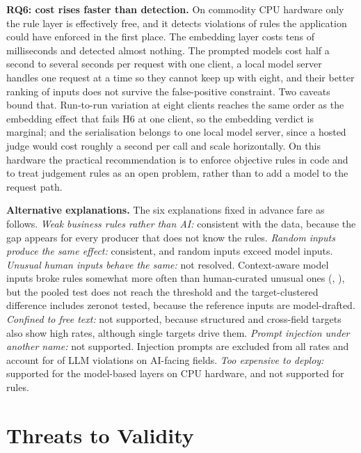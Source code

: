 \documentclass[journal]{IEEEtran}
\begin{document}
\textbf{RQ6: cost rises faster than detection.} On commodity CPU hardware only the rule layer is
effectively free, and it detects violations of rules the application could have enforced in the first
place. The embedding layer costs tens of milliseconds and detected almost nothing. The prompted models
cost half a second to several seconds per request with one client, a local model server handles one
request at a time so they cannot keep up with eight, and their better ranking of inputs does not
survive the false-positive constraint. Two caveats bound that. Run-to-run variation at eight clients
reaches the same order as the embedding effect that fails H6 at one client, so the embedding verdict is
marginal; and the serialisation belongs to one local model server, since a hosted judge would cost
roughly a second per call and scale horizontally. On this hardware the practical recommendation is to
enforce objective rules in code and to treat judgement rules as an open problem, rather than to add a
model to the request path.

\textbf{Alternative explanations.} The six explanations fixed in advance fare as follows. \emph{Weak
business rules rather than AI:} consistent with the data, because the gap appears for every producer
that does not know the rules. \emph{Random inputs produce the same effect:} consistent, and random
inputs exceed model inputs. \emph{Unusual human inputs behave the same:} \ifreviewed not resolved. Context-aware model inputs
broke rules somewhat more often than human-curated unusual ones (, ), but
the pooled test does not reach the threshold and the target-clustered difference includes
zero\else not tested, because the reference inputs are model-drafted\fi. \emph{Confined to free
text:} not supported, because structured and cross-field targets also show high rates, although single
targets drive them. \emph{Prompt injection under another name:} not supported. Injection prompts are
excluded from all rates and account for  of  LLM violations on AI-facing
fields. \emph{Too expensive to deploy:} supported for the model-based layers on CPU hardware, and not
supported for rules.

\section{Threats to Validity}
\label{sec:threats}
\end{document}
